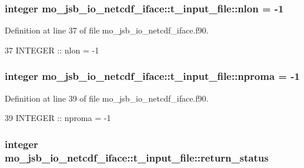 \subsubsection[{nlon}]{\setlength{\rightskip}{0pt plus 5cm}integer mo\+\_\+jsb\+\_\+io\+\_\+netcdf\+\_\+iface\+::t\+\_\+input\+\_\+file\+::nlon = -\/1}\label{structmo__jsb__io__netcdf__iface_1_1t__input__file_a621db761fc46e096067d4dd273e9700a}


Definition at line 37 of file mo\+\_\+jsb\+\_\+io\+\_\+netcdf\+\_\+iface.\+f90.


\begin{DoxyCode}
37     \textcolor{keywordtype}{INTEGER} :: nlon    = -1
\end{DoxyCode}
\hypertarget{structmo__jsb__io__netcdf__iface_1_1t__input__file_a217c1ce2b6a92c46b64c2150cac20bd7}{}
\subsubsection[{nproma}]{\setlength{\rightskip}{0pt plus 5cm}integer mo\+\_\+jsb\+\_\+io\+\_\+netcdf\+\_\+iface\+::t\+\_\+input\+\_\+file\+::nproma = -\/1}\label{structmo__jsb__io__netcdf__iface_1_1t__input__file_a217c1ce2b6a92c46b64c2150cac20bd7}


Definition at line 39 of file mo\+\_\+jsb\+\_\+io\+\_\+netcdf\+\_\+iface.\+f90.


\begin{DoxyCode}
39     \textcolor{keywordtype}{INTEGER} :: nproma  = -1
\end{DoxyCode}
\hypertarget{structmo__jsb__io__netcdf__iface_1_1t__input__file_a52fbe792ec5901f1ecbd38d5510bc04b}{}
\subsubsection[{return\+\_\+status}]{\setlength{\rightskip}{0pt plus 5cm}integer mo\+\_\+jsb\+\_\+io\+\_\+netcdf\+\_\+iface\+::t\+\_\+input\+\_\+file\+::return\+\_\+status}\label{structmo__jsb__io__netcdf__iface_1_1t__input__file_a52fbe792ec5901f1ecbd38d5510bc04b}


